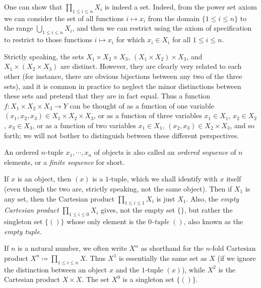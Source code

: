 \begin{remark}
One can show that \(\prod_{1 \leq i \leq n} X_i\) is indeed a set.
Indeed, from the power set axiom we can consider the set of all functions \(i \mapsto x_i\) from the domain \(\{1 \leq i \leq n\}\) to the range \(\bigcup_{1 \leq i \leq n} X_i\), and then we can restrict using the axiom of specification to restrict to those functions \(i \mapsto x_i\) for which \(x_i \in X_i\) for all \(1 \leq i \leq n\).
\end{remark}

Strictly speaking, the sets \(X_1 \times X_2 \times X_3\), \((X_1 \times X_2) \times X_3\), and \(X_1 \times (X_2 \times X_3)\) are distinct.
However, they are clearly very related to each other (for instance, there are obvious bijections between any two of the three sets), and it is common in practice to neglect the minor distinctions between these sets and pretend that they are in fact equal.
Thus a function \(f : X_1 \times X_2 \times X_3 \to Y\) can be thought of as a function of one variable \((x_1, x_2, x_3) \in X_1 \times X_2 \times X_3\), or as a function of three variables \(x_1 \in X_1\), \(x_2 \in X_2\), \(x_3 \in X_3\), or as a function of two variables \(x_1 \in X_1\), \((x_2, x_3) \in X_2 \times X_3\), and so forth;
we will not bother to distinguish between these different perspectives.

\begin{remark}
An ordered \(n\)-tuple \(x_1, \cdots, x_n\) of objects is also called an \emph{ordered sequence} of \(n\) elements, or a \emph{finite sequence} for short.
\end{remark}

If \(x\) is an object, then \((x)\) is a \(1\)-tuple, which we shall identify with \(x\) itself (even though the two are, strictly speaking, not the same object).
Then if \(X_1\) is any set, then the Cartesian product \(\prod_{1 \leq i \leq 1} X_i\) is just \(X_1\).
Also, the \emph{empty Cartesian product} \(\prod_{1 \leq i \leq 0} X_i\) gives, not the empty set \(\{\}\), but rather the singleton set \(\{()\}\) whose only element is the \emph{\(0\)-tuple} \(()\), also known as the \emph{empty tuple}.

If \(n\) is a natural number, we often write \(X^n\) as shorthand for the \(n\)-fold Cartesian product \(X^n \coloneqq \prod_{1 \leq i \leq n} X\).
Thus \(X^1\) is essentially the same set as \(X\) (if we ignore the distinction between an object \(x\) and the \(1\)-tuple \((x)\)), while \(X^2\) is the Cartesian product \(X \times X\).
The set \(X^0\) is a singleton set \(\{()\}\).

